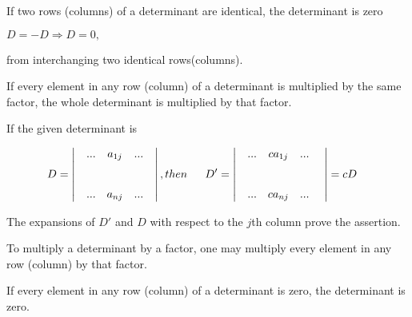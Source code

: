 \documentclass[11pt]{amsbook}
\begin{document}
	\begin{cor}
		If two rows (columns) of a determinant are identical, the determinant is zero


		\begin{center}
			$D = -D \Rightarrow D = 0 ,$
		\end{center}

		from interchanging two identical rows(columns).
	
	\end{cor}

	\begin{thm}
 	
 		If every element in any row (column) of a determinant is multiplied by the same factor, the whole determinant  is multiplied by that factor. \\

	\par If the given determinant is

	\begin{align}
 		D &=
		\begin{vmatrix}
			&...& a_{1j} &...&\\ 
 			&  & & \\ 
			& &  &  \\ 
			&... & a_{nj} &...&\notag
		\end{vmatrix}
		, then \hspace{16pt}D'=
		\begin{vmatrix}
		&...& ca_{1j} &...&\\ 
		&  & & \\ 
		& &  &  \\ 
		&... & ca_{nj} &...&\
		\end{vmatrix}
		=cD
	\end{align}

	\par The expansions of $D'$ and $D$ with respect to the $j$th column prove the assertion.

	\begin{cor}

		To multiply a determinant by a factor, one may multiply every element in any row (column) by that factor.
	
	\end{cor}

	\begin{cor}
	
	If every element in any row (column) of a determinant is zero, the determinant is zero. 
	

\end{cor}
\end{thm}
\end{document}
